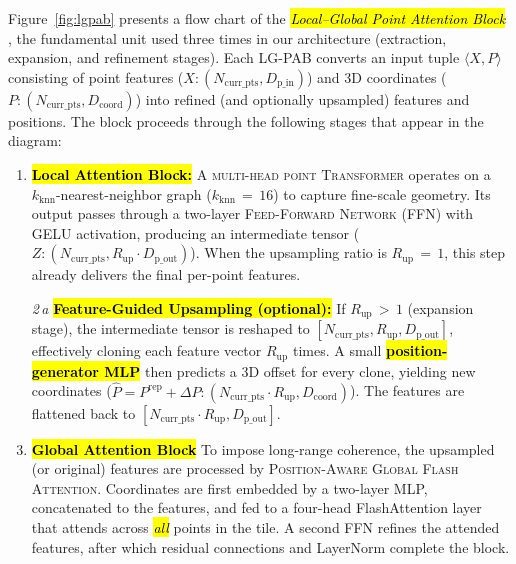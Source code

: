 \documentclass[remotesensing,article,accept,pdftex,moreauthors]{Definitions/mdpi}
\begin{document}

Figure~\ref{fig:lgpab} presents a flow chart of the \emph{\hl{Local–Global Point Attention Block}%
}, the fundamental unit used three times in our architecture (extraction, expansion, and refinement stages). Each LG-PAB converts an input tuple $\langle X, P \rangle$ consisting of point features ($X: (N_{\text{curr\_pts}}, D_{\text{p\_in}})$) and 3D coordinates ($P: (N_{\text{curr\_pts}}, D_{\text{coord}})$) into refined (and optionally upsampled) features and positions. The block proceeds through the following stages that appear in the diagram:

\begin{enumerate}[leftmargin=*]
\item \textbf{\hl{Local Attention Block:}}
      A %
      \textsc{multi-head point Transformer} operates on a $k_{\text{knn}}$-nearest-neighbor graph ($k_{\text{knn}}\,{=}\,16$) to capture fine-scale geometry. Its output passes through a two-layer \textsc{Feed-Forward Network} (FFN) with GELU activation, producing an intermediate tensor
      ($Z: (N_{\text{curr\_pts}}, R_{\text{up}} \cdot D_{\text{p\_out}})$). When the upsampling ratio is $R_{\text{up}}\,{=}\,1$, this step already delivers the final per-point features.

\item[\emph{2\,a}] \textbf{\hl{Feature-Guided Upsampling (optional):} %
}
      If $R_{\text{up}}\,{>}\,1$ (expansion stage), the intermediate tensor is reshaped to $[N_{\text{curr\_pts}}, R_{\text{up}}, D_{\text{p\_out}}]$, effectively cloning each feature vector $R_{\text{up}}$ times.
      A small \textbf{\hl{position-generator MLP}} then predicts a 3D offset for every clone, yielding new coordinates
      ($\hat{P} = P^{\text{rep}} + \Delta P: (N_{\text{curr\_pts}} \cdot R_{\text{up}}, D_{\text{coord}})$).
      The features are flattened back to $[N_{\text{curr\_pts}} \cdot R_{\text{up}}, D_{\text{p\_out}}]$.

\item \textbf{\hl{Global Attention Block}}
      To impose long-range coherence, the upsampled (or original) features are processed by %
      \textsc{Position-Aware Global Flash Attention}. Coordinates are first embedded by a two-layer MLP, concatenated to the features, and fed to a four-head FlashAttention layer that attends across \emph{\hl{all}} points in the tile. A second FFN refines the attended features, after which residual connections and LayerNorm complete the block.
\end{enumerate}
\end{document}

